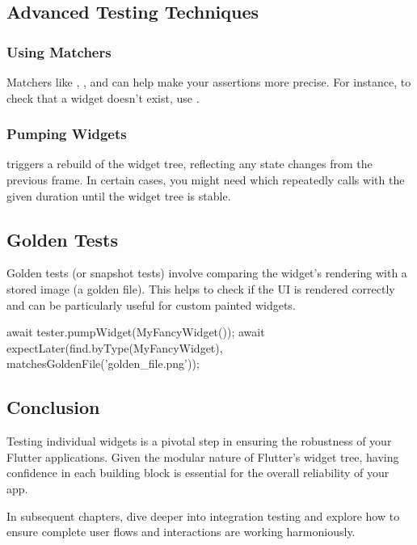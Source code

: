 \subsection*{Advanced Testing Techniques}

\subsubsection*{Using Matchers}

Matchers like , , and  can help make your assertions more precise. For instance, to check that a widget doesn't exist, use .

\subsubsection*{Pumping Widgets}

 triggers a rebuild of the widget tree, reflecting any state changes from the previous frame. In certain cases, you might need  which repeatedly calls  with the given duration until the widget tree is stable.

\subsection*{Golden Tests}

Golden tests (or snapshot tests) involve comparing the widget's rendering with a stored image (a golden file). 
This helps to check if the UI is rendered correctly and can be particularly useful for custom painted widgets.

\begin{dartcode}
await tester.pumpWidget(MyFancyWidget());
await expectLater(find.byType(MyFancyWidget), matchesGoldenFile('golden_file.png'));
\end{dartcode}

\subsection*{Conclusion}

Testing individual widgets is a pivotal step in ensuring the robustness of your Flutter applications. 
Given the modular nature of Flutter's widget tree, having confidence in each building block is essential for the overall reliability of your app.

In subsequent chapters, dive deeper into integration testing and explore how to ensure complete user flows and interactions are working harmoniously.

